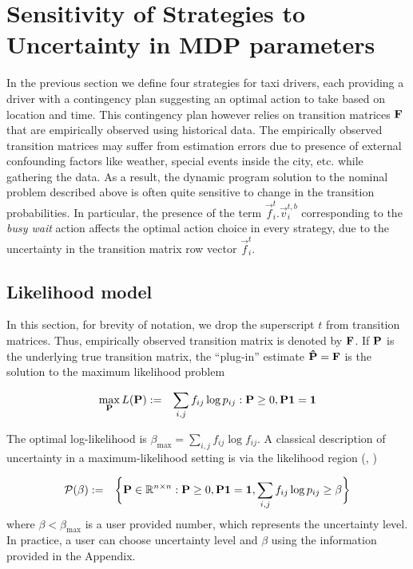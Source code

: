 
\section{Sensitivity of Strategies to Uncertainty in MDP parameters}
\label{sec:sensitivity_of_strategies}

In the previous section we define four strategies for taxi drivers, each providing a driver with a contingency plan suggesting an optimal action to take based on location and time. This contingency plan however relies on transition matrices $\mathbf{F}$ that are empirically observed using historical data. The empirically observed transition matrices may suffer from estimation errors due to presence of external confounding factors like weather, special events inside the city, etc. while gathering the data. As a result, the dynamic program solution to the nominal problem described above is often quite sensitive to change in the transition probabilities. In particular, the presence of the term $\vec{f}_{i}^{t}.\vec{v}_{i}^{t,b}$ corresponding to the \textit{busy wait} action affects the optimal action choice in every strategy, due to the uncertainty in the transition matrix row vector $\vec{f}_{i}^{t}$.

\subsection{Likelihood model}
\label{sec:likelihood_model}

In this section, for brevity of notation, we drop the superscript $t$ from transition matrices. Thus, empirically observed transition matrix is denoted by $\mathbf{F}$. If $\mathbf{P}$ is the underlying true transition matrix, the ``plug-in'' estimate $\mathbf{\hat{P}} = \mathbf{F}$ is the solution to the maximum likelihood problem

\begin{eqnarray}
\max_{\mathbf{P}} L(\mathbf{P}) &:=& \sum_{i,j}f_{ij} \log{p_{ij}} : \mathbf{P}\geq 0, \mathbf{P}\mathbf{1} = \mathbf{1} 
\end{eqnarray}

The optimal log-likelihood is $\beta_{\max} = \sum_{i,j}f_{ij}\log{f_{ij}}$.
A classical description of uncertainty in a maximum-likelihood setting is via the likelihood region (\cite{lehmann2006theory}, \cite{poor2013introduction})

\begin{eqnarray}
\mathcal{P(\beta)} &:=& \bigg\{\mathbf{P} \in \mathbb{R}^{n \times n}: \mathbf{P} \geq 0, \mathbf{P}\mathbf{1}=\mathbf{1}, \sum_{i,j}f_{ij}\log{p_{ij}} \geq \beta\bigg\} \label{eq:likelihood_region}
\end{eqnarray}
where $\beta < \beta_{\max}$ is a user provided number, which represents the uncertainty level. In practice, a user can choose uncertainty level and $\beta$ using the information provided in the Appendix. 

